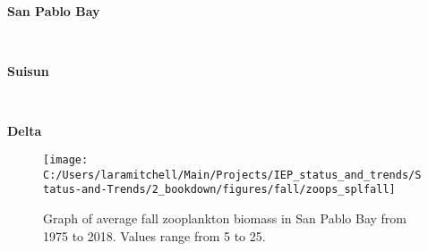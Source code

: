 \documentclass[
]{book}
\begin{document}
\begin{panel-grid}

\begin{columns-nocenter}

\begin{column800}

\textbf{San Pablo Bay}

\end{column800}

\begin{column40}

~

\end{column40}

\begin{column800}

\textbf{Suisun}

\end{column800}

\begin{column40}

~

\end{column40}

\begin{column800}

\textbf{Delta}

\end{column800}

\end{columns-nocenter}

\begin{columns-nocenter}

\begin{column800}

\begin{expand}

\begin{figure}
\texttt{[image: C:/Users/laramitchell/Main/Projects/IEP\_status\_and\_trends/Status-and-Trends/2\_bookdown/figures/fall/zoops\_splfall]} \caption{Graph of average fall zooplankton biomass in San Pablo Bay from 1975 to 2018. Values range from 5 to 25.}\label{fig:unnamed-chunk-115}
\end{figure}

\end{expand}

\end{column800}

\begin{column40}

~


\end{column40}
\end{columns-nocenter}
\end{panel-grid}
\end{document}
